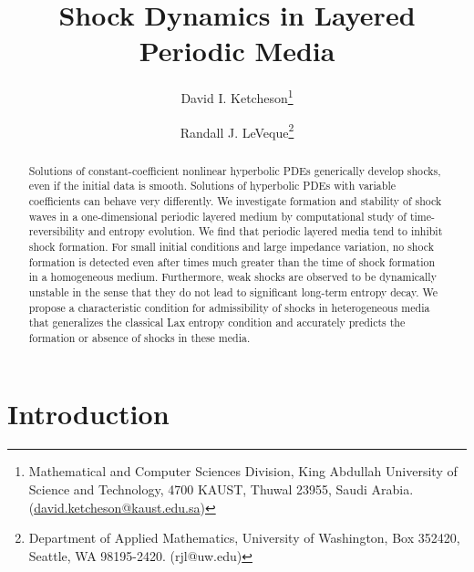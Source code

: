 \documentclass{article}
\begin{document}
\title{Shock Dynamics in Layered Periodic Media}

\author{%
  David I. Ketcheson\thanks{Mathematical and Computer Sciences Division, King Abdullah University of Science and
    Technology, 4700 KAUST, Thuwal 23955, Saudi Arabia.
   (\protect\url{david.ketcheson@kaust.edu.sa})} \and
    Randall J. LeVeque\thanks{Department of Applied Mathematics, University of Washington, Box 352420, Seattle, WA 98195-2420.
   (\mbox{rjl@uw.edu}) }}

\maketitle



\begin{abstract}
Solutions of constant-coefficient nonlinear hyperbolic PDEs generically 
develop shocks, even if the initial data is smooth.  Solutions of hyperbolic
PDEs with variable coefficients can behave very differently.
We investigate formation and stability of shock waves in a one-dimensional 
periodic layered medium by computational study of time-reversibility and entropy 
evolution.
We find that periodic layered media tend to inhibit shock formation.
For small initial conditions and large impedance variation, 
no shock formation is detected even
after times much greater than the time of shock formation in a homogeneous
medium.  Furthermore, weak shocks are observed to be dynamically unstable in
the sense that they do not lead to significant long-term entropy decay.
We propose a characteristic condition for admissibility of shocks in heterogeneous
media that generalizes the classical Lax entropy condition
and accurately predicts the formation or absence of shocks in these media.
\end{abstract}

\pagestyle{myheadings}
\thispagestyle{plain}


\section{Introduction\label{intro}}

\end{document}
